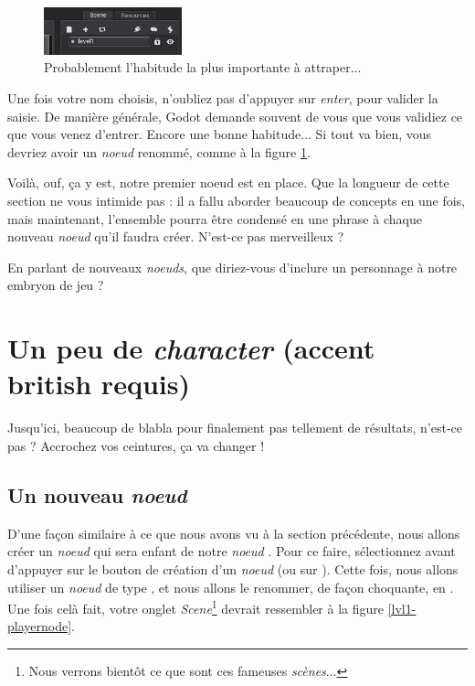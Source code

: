 \begin{figure}
  \begin{center}
    \includegraphics[width=4cm]{img/lvl1-rename.png}
  \end{center}
  \caption{\label{lvl1-rename} Probablement l'habitude la plus importante à attraper...}
\end{figure}

Une fois votre nom choisis, n'oubliez pas d'appuyer sur \emph{enter}, pour valider la saisie. De manière générale, Godot demande souvent de vous que vous validiez ce que vous venez d'entrer. Encore une bonne habitude... Si tout va bien, vous devriez avoir un \emph{noeud} renommé, comme à la figure \ref{lvl1-rename}.

Voilà, ouf, ça y est, notre premier noeud est en place. Que la longueur de cette section ne vous intimide pas : il a fallu aborder beaucoup de concepts en une fois, mais maintenant, l'ensemble pourra être condensé en une phrase à chaque nouveau \emph{noeud} qu'il faudra créer. N'est-ce pas merveilleux ?

En parlant de nouveaux \emph{noeuds}, que diriez-vous d'inclure un personnage à notre embryon de jeu ?

\section{Un peu de \emph{character} (accent british requis)}

Jusqu'ici, beaucoup de blabla pour finalement pas tellement de résultats, n'est-ce pas ? Accrochez vos ceintures, ça va changer !

\subsection{Un nouveau \emph{noeud}}

D'une façon similaire à ce que nous avons vu à la section précédente, nous allons créer un \emph{noeud} qui sera enfant de notre \emph{noeud} . Pour ce faire, sélectionnez  avant d'appuyer sur le bouton de création d'un \emph{noeud} (ou sur ). Cette fois, nous allons utiliser un \emph{noeud} de type , et nous allons le renommer, de façon choquante, en . Une fois celà fait, votre onglet \emph{Scene}\footnote{Nous verrons bientôt ce que sont ces fameuses \emph{scènes}...} devrait ressembler à la figure \ref{lvl1-playernode}.

